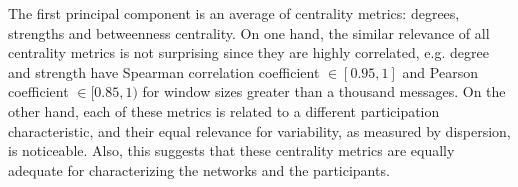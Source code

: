 \documentclass[%
	aip,
	jmp,%
	amsmath,amssymb,
	reprint,%
]{revtex4-1}
\begin{document}
																																																																																				The first principal component is an average of centrality metrics:
																																																																																				degrees, strengths and betweenness centrality.
																																																																																				On one hand, the similar relevance of all centrality metrics is not surprising since they are highly correlated,
																																																																																				e.g. degree and strength have Spearman correlation coefficient $\in [0.95,1]$ 
																																																																																				and Pearson coefficient $\in [0.85,1)$ for window sizes greater than a thousand messages.
																																																																																					On the other hand, each of these metrics is related to a different participation characteristic,
																																																																																					and their equal relevance for variability,
																																																																																					as measured by dispersion, is noticeable.
																																																																																					Also, this suggests that these centrality metrics 
																																																																																					are equally adequate for characterizing the networks
																																																																																					and the participants.
\end{document}
